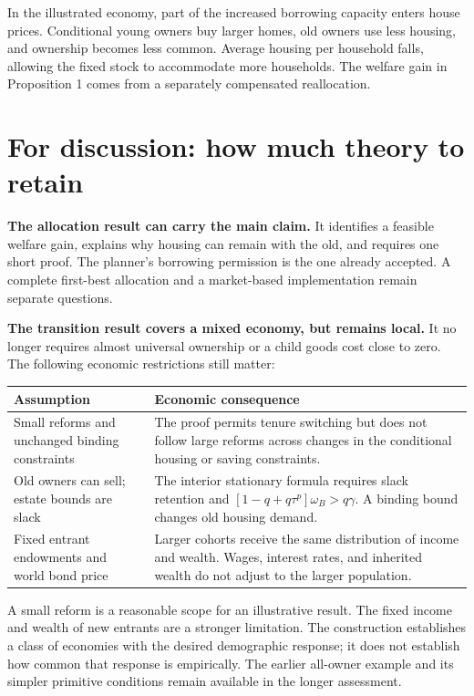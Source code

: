 \documentclass[11pt]{article}
\begin{document}
In the illustrated economy, part of the increased borrowing capacity enters
house prices. Conditional young owners buy larger homes, old owners use less
housing, and ownership becomes less common. Average housing per household
falls, allowing the fixed stock to accommodate more households. The welfare
gain in Proposition 1 comes from a separately compensated reallocation.

\newpage
\section*{For discussion: how much theory to retain}

\textbf{The allocation result can carry the main claim.} It identifies a
feasible welfare gain, explains why housing can remain with the old, and
requires one short proof. The planner's borrowing permission is the one
already accepted. A complete first-best allocation and a market-based
implementation remain separate questions.

\textbf{The transition result covers a mixed economy, but remains local.}
It no longer requires almost universal ownership or a child goods cost close
to zero. The following economic restrictions still matter:

\renewcommand{\arraystretch}{1.2}
\begin{tabularx}{\textwidth}{@{}p{}>{\raggedright\arraybackslash}X@{}}
\toprule
Assumption & Economic consequence\\
\midrule
Small reforms and unchanged binding constraints
& The proof permits tenure switching but does not follow large reforms across
changes in the conditional housing or saving constraints.\\
Old owners can sell; estate bounds are slack
& The interior stationary formula requires slack retention and
\mbox{$[1-q+q\tau^p]\omega_B>q\gamma$}. A binding bound changes old housing demand.\\
Fixed entrant endowments and world bond price
& Larger cohorts receive the same distribution of income and wealth. Wages,
interest rates, and inherited wealth do not adjust to the larger population.\\
\bottomrule
\end{tabularx}

A small reform is a reasonable scope for an illustrative result. The fixed
income and wealth of new entrants are a stronger limitation. The construction
establishes a class of economies with the desired demographic response; it
does not establish how common that response is empirically. The earlier
all-owner example and its simpler primitive conditions remain available in
the longer assessment.
\end{document}
